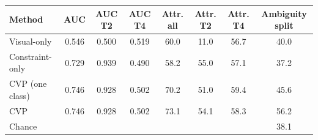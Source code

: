 \begin{tabular}{lccccccc}
\toprule
Method & AUC & AUC T2 & AUC T4 & Attr. all & Attr. T2 & Attr. T4 & Ambiguity split\\
\midrule
Visual-only & 0.546 & 0.500 & 0.519 & 60.0 & 11.0 & 56.7 & 40.0\\
Constraint-only & 0.729 & 0.939 & 0.490 & 58.2 & 55.0 & 57.1 & 37.2\\
CVP (one class) & 0.746 & 0.928 & 0.502 & 70.2 & 51.0 & 59.4 & 45.6\\
CVP & 0.746 & 0.928 & 0.502 & 73.1 & 54.1 & 58.3 & 56.2\\
\midrule
Chance & & & & & & & 38.1\\
\bottomrule
\end{tabular}
